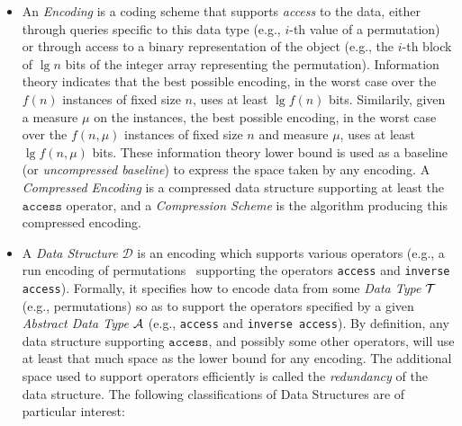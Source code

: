 \documentclass[a4paper,10pt]{article}
\newcommand{\access}{\ensuremath{\texttt{access}}}
\newcommand{\dataType}{\ensuremath{{\cal T}}}
\newcommand{\abstractDataType}{\ensuremath{{\cal A}}}
\begin{document}
\begin{itemize}
\item An \emph{Encoding} is a coding scheme that supports \emph{access} to the data, either through queries specific to this data type (e.g., $i$-th value of a permutation) or through access to a binary representation of the object (e.g., the $i$-th block of $\lg n$ bits of the integer array representing the permutation).  Information theory indicates that the best possible encoding, in the worst case over the $f(n)$ instances of fixed size $n$, uses at least $\lg f(n)$ bits. 
%
Similarily, given a measure $\mu$ on the instances,  the best possible encoding, in the worst case over the $f(n,\mu)$ instances of fixed size $n$ and measure $\mu$, uses at least $\lg f(n,\mu)$ bits. 
%
These information theory lower bound is used as a baseline (or \emph{uncompressed baseline}) to express the space taken by any encoding.  A \emph{Compressed Encoding} is a compressed data structure supporting at least the {\access} operator, and a \emph{Compression Scheme} is the algorithm producing this compressed encoding.

\item A \emph{Data Structure} $\mathcal{D}$ is an encoding which supports various operators (e.g., a run encoding of permutations~\cite{2013-TCS-CompressedRepresentationsOfPermutationsAndApplications-BarbayNavarro} supporting the operators \texttt{access} and \texttt{inverse access}). Formally, it specifies how to encode data from some \emph{Data Type} {\dataType} (e.g., permutations) so as to support the operators specified by a given \emph{Abstract Data Type} {\abstractDataType} (e.g., \texttt{access} and \texttt{inverse access}).  By definition, any data structure supporting {\access}, and possibly some other operators, will use at least that much space as the lower bound for any encoding. The additional space used to support operators efficiently is called the \emph{redundancy} of the data structure. The following classifications of Data Structures are of particular interest:


\end{itemize}
\end{document}
